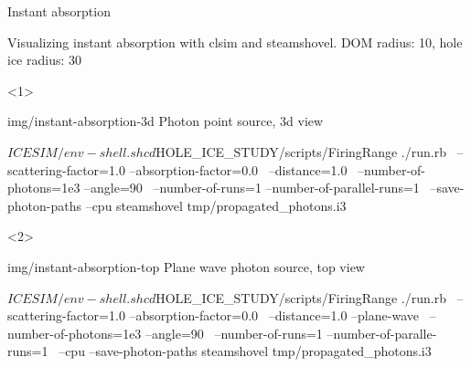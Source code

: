 \begin{frame}[fragile]{Instant absorption}

  Visualizing instant absorption with clsim and steamshovel.
  \small{DOM radius: 10\cm, hole ice radius: 30\cm}

  \begin{onlyenv}<1>
    \begin{sideimage}{img/instant-absorption-3d}
      Photon point source, 3d view

      \begin{bash}
        $ICESIM/env-shell.sh
        cd $HOLE_ICE_STUDY/scripts/FiringRange
        ./run.rb \
            --scattering-factor=1.0 --absorption-factor=0.0 \
            --distance=1.0 \
            --number-of-photons=1e3 --angle=90 \
            --number-of-runs=1 --number-of-parallel-runs=1 \
            --save-photon-paths --cpu
        steamshovel tmp/propagated_photons.i3
      \end{bash}
    \end{sideimage}
  \end{onlyenv}

  \begin{onlyenv}<2>
    \begin{sideimage}{img/instant-absorption-top}
      Plane wave photon source, top view

      \begin{bash}
        $ICESIM/env-shell.sh
        cd $HOLE_ICE_STUDY/scripts/FiringRange
        ./run.rb \
            --scattering-factor=1.0 --absorption-factor=0.0 \
            --distance=1.0 --plane-wave \
            --number-of-photons=1e3 --angle=90 \
            --number-of-runs=1 --number-of-paralle-runs=1 \
            --cpu --save-photon-paths
        steamshovel tmp/propagated_photons.i3
      \end{bash}
    \end{sideimage}
  \end{onlyenv}

\end{frame}
